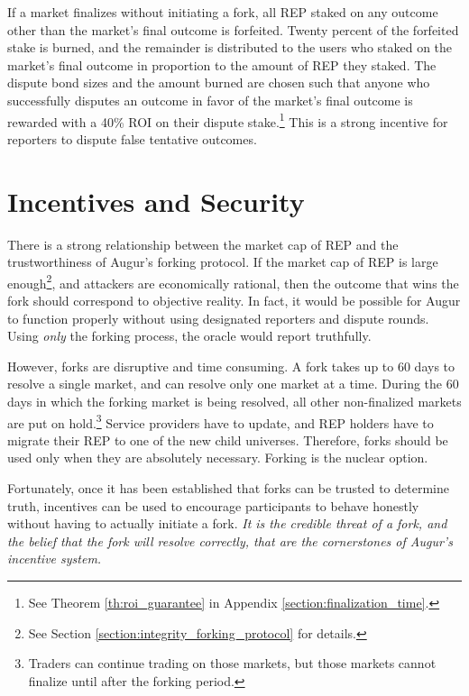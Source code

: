 \documentclass[floatfix,reprint,nofootinbib,amsmath,amssymb,epsfig,pre,floats,letterpaper,groupedaffiliation]{revtex4-1}
\theoremstyle{definition}
\theoremstyle{definition}
\begin{document}
If a market finalizes without initiating a fork, all REP staked on any outcome other than the market's final outcome is forfeited. Twenty percent of the forfeited stake is burned, and the remainder is distributed to the users who staked on the market's final outcome in proportion to the amount of REP they staked.  The dispute bond sizes and the amount burned are chosen such that anyone who successfully disputes an outcome in favor of the market's final outcome is rewarded with a 40\% ROI on their dispute stake.\footnote{See Theorem \ref{th:roi_guarantee} in Appendix \ref{section:finalization_time}.}  This is a strong incentive for reporters to dispute false tentative outcomes.


\section{Incentives and Security}\label{section:incentives_and_security}

There is a strong relationship between the market cap of REP and the trustworthiness of Augur's forking protocol.  If the market cap of REP is large enough\footnote{See Section \ref{section:integrity_forking_protocol} for details.}, and attackers are economically rational, then the outcome that wins the fork should correspond to objective reality.  In fact, it would be possible for Augur to function properly without using designated reporters and dispute rounds.  Using \textit{only} the forking process, the oracle would report truthfully.

However, forks are disruptive and time consuming.  A fork takes up to 60 days to resolve a single market, and can resolve only one market at a time.  During the 60 days in which the forking market is being resolved, all other non-finalized markets are put on hold.\footnote{Traders can continue trading on those markets, but those markets cannot finalize until after the forking period.}  Service providers have to update, and REP holders have to migrate their REP to one of the new child universes.  Therefore, forks should be used only when they are absolutely necessary.  Forking is the nuclear option.

Fortunately, once it has been established that forks can be trusted to determine truth, incentives can be used to encourage participants to behave honestly without having to actually initiate a fork.  \textit{It is the credible threat of a fork, and the belief that the fork will resolve correctly, that are the cornerstones of Augur's incentive system.}
\end{document}
